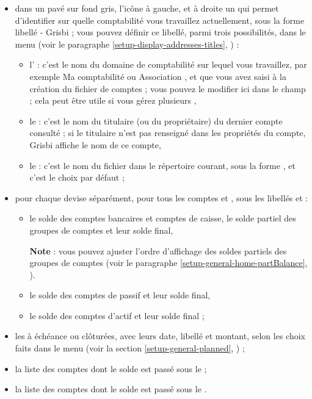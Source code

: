 \begin{itemize}
	 \item dans un pavé sur fond gris, l'icône  à gauche, et à droite un  qui permet d'identifier sur quelle comptabilité vous travaillez actuellement, sous la forme \og libellé - Grisbi\fg{} ; vous pouvez définir ce libellé, parmi trois possibilités, dans le menu  (voir le paragraphe \vref{setup-display-addresses-titles}, ) :
		\begin{itemize}
			 \item l' : c'est le nom du domaine de comptabilité sur lequel vous travaillez, par exemple \og Ma comptabilité \fg{} ou \og Association \fg{}, et que vous avez saisi à la création du fichier de comptes ; vous pouvez le modifier ici dans le champ  ; cela peut être utile si vous gérez plusieurs , 
			 \item le  : c'est le nom du titulaire (ou du propriétaire) du dernier compte consulté ; si le titulaire n'est pas renseigné dans les propriétés du compte, Grisbi affiche le nom de ce compte,
			 \item le  : c'est le nom du fichier dans le répertoire courant, sous la forme , et c'est le choix par défaut ;
		\end{itemize}
	 \item pour chaque devise séparément, pour tous les comptes et , sous les libellés  et  :
		\begin{itemize}
			 \item le solde des comptes bancaires et comptes de caisse, le solde partiel des groupes de comptes et leur solde final,

			 \textbf{Note} : vous pouvez ajuster l'ordre d'affichage des soldes partiels des groupes de comptes (voir le paragraphe \vref{setup-general-home-partBalance}, ).			 
			 \item le solde des comptes de passif et leur solde final,
			 \item le solde des comptes d'actif et leur solde final ;
		\end{itemize}
	\item les  à échéance ou clôturées, avec leurs date, libellé et montant, selon les choix faits dans le menu  (voir la section \vref{setup-general-planned}, ) ;
	\item la liste des comptes dont le solde est passé sous le  ;
	\item la liste des comptes dont le solde est passé sous le .
\end{itemize}

